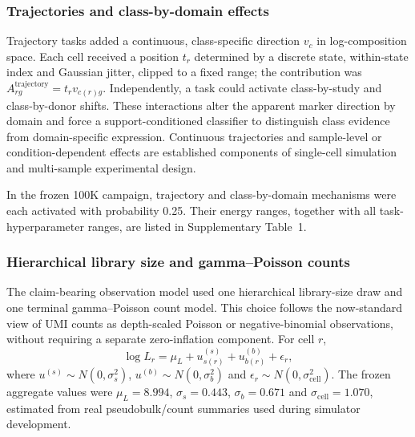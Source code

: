 \documentclass[12pt]{article}
\begin{document}
\subsubsection*{Trajectories and class-by-domain effects}

Trajectory tasks added a continuous, class-specific direction $v_c$ in log-composition space. Each cell received a position $t_r$ determined by a discrete state, within-state index and Gaussian jitter, clipped to a fixed range; the contribution was $A^{\mathrm{trajectory}}_{rg}=t_rv_{c(r)g}$. Independently, a task could activate class-by-study and class-by-donor shifts. These interactions alter the apparent marker direction by domain and force a support-conditioned classifier to distinguish class evidence from domain-specific expression. Continuous trajectories and sample-level or condition-dependent effects are established components of single-cell simulation and multi-sample experimental design\cite{zhang2019symsim,song2024scdesign3}.

In the frozen 100K campaign, trajectory and class-by-domain mechanisms were each activated with probability 0.25. Their energy ranges, together with all task-hyperparameter ranges, are listed in Supplementary Table~1.

\subsubsection*{Hierarchical library size and gamma--Poisson counts}

The claim-bearing observation model used one hierarchical library-size draw and one terminal gamma--Poisson count model. This choice follows the now-standard view of UMI counts as depth-scaled Poisson or negative-binomial observations, without requiring a separate zero-inflation component\cite{lopez2018scvi,hafemeister2019sctransform,townes2019multinomial,svensson2020zeroinflation}. For cell $r$,
\begin{equation}
\log L_r=\mu_L+u^{(s)}_{s(r)}+u^{(b)}_{b(r)}+\epsilon_r,
\end{equation}
where $u^{(s)}\sim N(0,\sigma_s^2)$, $u^{(b)}\sim N(0,\sigma_b^2)$ and $\epsilon_r\sim N(0,\sigma_{\mathrm{cell}}^2)$. The frozen aggregate values were $\mu_L=8.994$, $\sigma_s=0.443$, $\sigma_b=0.671$ and $\sigma_{\mathrm{cell}}=1.070$, estimated from real pseudobulk/count summaries used during simulator development.
\end{document}
